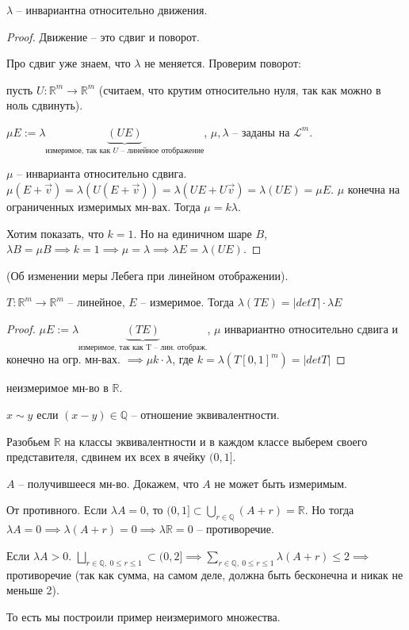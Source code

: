 \begin{theorem}
    $\lambda$ -- инвариантна относительно движения.
\end{theorem}
\begin{proof}
    Движение -- это сдвиг и поворот.

    Про сдвиг уже знаем, что $\lambda$ не меняется. Проверим поворот:

    пусть $U: \mathbb{R}^m \rightarrow \mathbb{R}^m$ (считаем, что крутим относительно нуля, так как можно в ноль сдвинуть).

    $\mu E := \lambda \underbrace{(UE)}_{\text{измеримое, так как $U$ -- линейное отображение}}$, $\mu, \lambda$ -- заданы на $\mathscr{L}^m$.

    $\mu$ -- инварианта относительно сдвига. $\mu (E + \vec{v}) = \lambda (U(E + \vec{v})) = \lambda(UE + U \vec{v}) = \lambda (UE) = \mu E$. $\mu$ конечна на ограниченных измеримых мн-вах. Тогда $\mu = k \lambda$.

    Хотим показать, что $k = 1$. Но на единичном шаре $B$, $\lambda B = \mu B \implies k = 1 \implies \mu = \lambda \implies \lambda E = \lambda (UE)$.
\end{proof}

\begin{theorem}
    (Об изменении меры Лебега при линейном отображении).

    $T: \mathbb{R}^m \rightarrow \mathbb{R}^m$ -- линейное, $E$ -- измеримое. Тогда $\lambda (TE) = |det T| \cdot \lambda E$
\end{theorem}
\begin{proof}
    $\mu E := \lambda \underbrace{(TE)}_{\text{измеримое, так как T -- лин. отображ.}}$, $\mu$ инвариантно относительно сдвига и конечно на огр. мн-вах. $\implies \mu k \cdot \lambda$, где $k = \lambda (T [0, 1]^m) = |det T|$

\end{proof}

\begin{example}
    неизмеримое мн-во в $\mathbb{R}$.

    $x \sim y$ если $(x - y) \in \mathbb{Q}$ -- отношение эквивалентности.

    Разобьем $\mathbb{R}$ на классы эквивалентности и в каждом классе выберем своего представителя, сдвинем их всех в ячейку $(0, 1]$.

    $A$ --  получившееся мн-во. Докажем, что $A$ не может быть измеримым. 

    От противного. Если $\lambda A = 0$, то $(0, 1] \subset \bigcup_{r \in \mathbb{Q}} (A + r) = \mathbb{R}$. Но тогда $\lambda A = 0 \implies \lambda (A + r) = 0 \implies \lambda \mathbb{R} = 0$ -- противоречие.

    Если $\lambda A > 0$. $\bigsqcup_{r \in \mathbb{Q}, \ 0 \leq r \leq 1} \subset (0, 2] \implies \sum_{r \in \mathbb{Q}, \ 0 \leq r \leq 1} \lambda (A + r) \leq 2 \implies $ противоречие (так как сумма, на самом деле, должна быть бесконечна и никак не меньше 2).

    То есть мы построили пример неизмеримого множества.
\end{example}